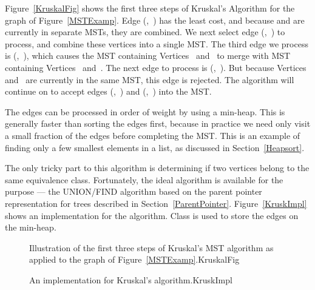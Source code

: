 \begin{example}
Figure~\ref{KruskalFig} shows the first three steps of Kruskal's
Algorithm for the graph of Figure~\ref{MSTExamp}.
Edge (,~) has the least cost, and because
 and  are currently in separate MSTs, they are
combined.
We next select edge (,~) to process, and combine these
vertices into a single MST.
The third edge we process is (,~), which causes the
MST containing Vertices~ and~ to merge with MST
containing Vertices~ and~.
The next edge to process is (,~).
But because Vertices~ and~ are currently in the same
MST, this edge is rejected.
The algorithm will continue on to accept edges (,~)
and (,~) into the MST.
\end{example}

The edges can be processed in order of weight by using a
min-heap.
This is generally faster than sorting the edges first, because in
practice we need only visit a small fraction of the edges before
completing the MST.
This is an example of finding only a few smallest elements in a list,
as discussed in Section~\ref{Heapsort}.

The only tricky part to this algorithm is determining if two vertices
belong to the same equivalence class.
Fortunately, the ideal algorithm is available for the purpose ---
the UNION/FIND algorithm based on
the parent pointer representation for trees described in
Section~\ref{ParentPointer}.
Figure~\ref{KruskImpl} shows an implementation for the algorithm.
Class  is used to store the edges on the min-heap.

\begin{figure}
{Illustration of the first three steps of Kruskal's MST algorithm as
applied to the graph of Figure~\ref{MSTExamp}.}{KruskalFig}
\medskip
\end{figure}

\begin{figure}
\bigskip

\vspace{-\bigskipamount}
\vspace{-\medskipamount}
{An implementation for Kruskal's algorithm.}{KruskImpl}
\end{figure}

